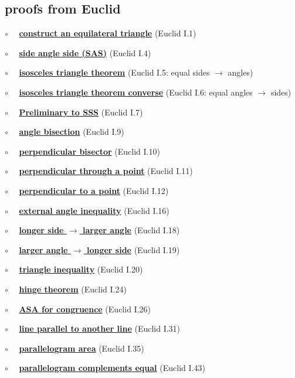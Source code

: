 \documentclass[11pt, oneside]{article}
\begin{document}
\subsection*{proofs from Euclid}

$\circ$ \ \ \hyperref[sec:Euclid_I_1]{\textbf{construct an equilateral triangle}} (Euclid I.1)

$\circ$ \ \ \hyperref[sec:Euclid_I_4]{\textbf{side angle side (SAS)}} (Euclid I.4)

$\circ$ \ \ \hyperref[sec:Euclid_I_5]{\textbf{isosceles triangle theorem}} (Euclid I.5:  equal sides $\rightarrow$ angles)

$\circ$ \ \ \hyperref[sec:Euclid_I_6]{\textbf{isosceles triangle theorem converse}} (Euclid I.6:  equal angles $\rightarrow$ sides)

$\circ$ \ \ \hyperref[sec:Euclid_I_7]{\textbf{Preliminary to SSS}} (Euclid I.7)

$\circ$ \ \ \hyperref[sec:Euclid_I_9]{\textbf{angle bisection}} (Euclid I.9)

$\circ$ \ \ \hyperref[sec:Euclid_I_10]{\textbf{perpendicular bisector}} (Euclid I.10)

$\circ$ \ \ \hyperref[sec:Euclid_I_11]{\textbf{perpendicular through a point}} (Euclid I.11)

$\circ$ \ \ \hyperref[sec:Euclid_I_12]{\textbf{perpendicular to a point}} (Euclid I.12)

$\circ$ \ \ \hyperref[sec:Euclid_I_16]{\textbf{external angle inequality}} (Euclid I.16)

$\circ$ \ \ \hyperref[sec:Euclid_I_18]{\textbf{longer side $\rightarrow$ larger angle}}  (Euclid I.18)

$\circ$ \ \ \hyperref[sec:Euclid_I_19]{\textbf{larger angle $\rightarrow$ longer side}} (Euclid I.19)

$\circ$ \ \ \hyperref[sec:triangle_inequality]{\textbf{triangle inequality}} (Euclid I.20)

$\circ$ \ \ \hyperref[sec:hinge_theorem]{\textbf{hinge theorem}} (Euclid I.24)

$\circ$ \ \ \hyperref[sec:ASA]{\textbf{ASA for congruence}} (Euclid I.26)

$\circ$ \ \ \hyperref[sec:Euclid_I_31]{\textbf{line parallel to another line}} (Euclid I.31)

$\circ$ \ \ \hyperref[sec:Euclid_I_35]{\textbf{parallelogram area}} (Euclid I.35)

$\circ$ \ \ \hyperref[sec:Euclid_I_43]{\textbf{parallelogram complements equal}} (Euclid I.43)
\end{document}
